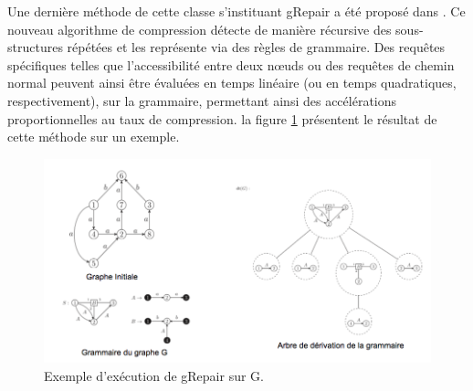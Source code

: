 
	Une dernière méthode de cette classe s'instituant gRepair a été proposé dans \citep{maneth2018grammar}. Ce nouveau algorithme de compression détecte de manière récursive des sous-structures répétées et les représente via des règles de grammaire.  Des requêtes spécifiques telles que l'accessibilité entre deux nœuds ou des requêtes de chemin normal peuvent ainsi être évaluées en temps linéaire (ou en temps quadratiques, respectivement), sur la grammaire, permettant ainsi des accélérations proportionnelles au taux de compression. la figure \ref{gRepair} présentent le résultat de cette méthode sur un exemple. 
	
	\begin{figure}[h]
			\includegraphics[scale=0.5,center]{./ressources/image/grepair.png}
			\caption[Exemple d'exécution de gRepair sur G.]{Exemple d'exécution de gRepair sur G.}
			\label{gRepair}
	\end{figure}